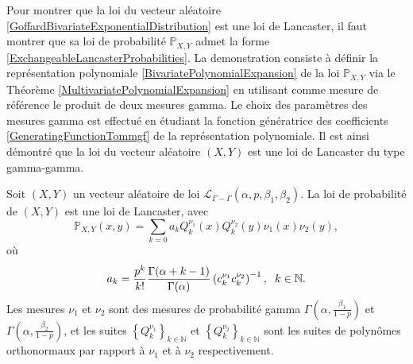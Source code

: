 Pour montrer que la loi du vecteur aléatoire \eqref{GoffardBivariateExponentialDistribution} est une loi de Lancaster, il faut montrer que sa loi de probabilité $\mathbb{P}_{X,Y}$ admet la forme \eqref{ExchangeableLancasterProbabilities}.  La demonstration consiste à définir la représentation polynomiale \eqref{BivariatePolynomialExpansion} de la loi $\mathbb{P}_{X,Y}$ via le Théorème \ref{MultivariatePolynomialExpansion} en utilisant comme mesure de référence le produit de deux mesures gamma. Le choix des paramètres des mesures gamma est effectué en étudiant la fonction génératrice des coefficients \eqref{GeneratingFunctionTommgf} de la représentation polynomiale. Il est ainsi démontré que la loi du vecteur aléatoire $(X,Y)$ est une loi de Lancaster du type gamma-gamma.      
\begin{Prop}\label{DBVELancaster}
Soit $(X,Y)$ un vecteur aléatoire de loi $\mathcal{L}_{\Gamma-\Gamma}(\alpha,p,\beta_{1},\beta_{2})$. La loi de probabilité de $(X,Y)$ est une loi de Lancaster, avec
\begin{equation}\label{DBVELancasterDensity}
\mathbb{P}_{X,Y}(x,y)=\sum_{k=0}a_{k}Q_{k}^{\nu_{1}}(x)Q_{k}^{\nu_{2}}(y)\nu_{1}(x)\nu_{2}(y),
\end{equation}
où 
\begin{equation}\label{ExpansionCoefficientGoffardBivariateExponentialDistribution}
a_{k}=\frac{p^{k}}{k!}\frac{\Gamma(\alpha+k-1)}{\Gamma(\alpha)}\left(c^{\nu_{1}}_{k}c^{\nu_{2}}_{k}\right)^{-1},\hspace{0.2cm}k\in\mathbb{N}.
\end{equation}
Les mesures $\nu_{1}$ et $\nu_{2}$ sont des mesures de probabilité gamma $\Gamma\left(\alpha,\frac{\beta_{1}}{1-p}\right)$ et $\Gamma\left(\alpha,\frac{\beta_{2}}{1-p}\right)$, et les suites $\left\{Q_{k}^{\nu_{1}}\right\}_{k\in\mathbb{N}}$ et $\left\{Q_{k}^{\nu_{2}}\right\}_{k\in\mathbb{N}}$ sont les suites de polynômes orthonormaux par rapport à $\nu_{1}$ et à $\nu_{2}$ respectivement. 
\end{Prop} 
